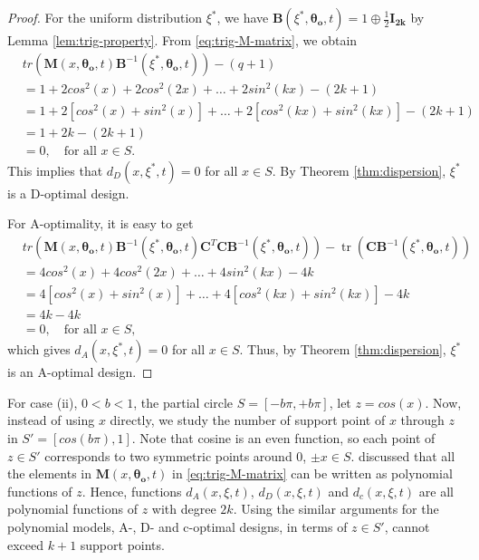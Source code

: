 \documentclass[
]{book}
\theoremstyle{definition}
\theoremstyle{definition}
\theoremstyle{definition}
\theoremstyle{definition}
\theoremstyle{remark}
\begin{document}
\begin{proof}
For the uniform distribution \(\xi^*\), we have \(\boldsymbol{B}(\xi^*,\boldsymbol{\theta_o},t)=1\oplus \frac{1}{2} \boldsymbol{I_{2k}}\) by Lemma \ref{lem:trig-property}. From \eqref{eq:trig-M-matrix}, we obtain
\begin{equation*}
\begin{aligned}
&tr(\boldsymbol{M}(x,\boldsymbol{\theta_o},t)\boldsymbol{B}^{-1}(\xi^*,\boldsymbol{\theta_o},t))-(q+1)\\    &=1+2cos^2(x)+2cos^2(2x)+\dots+2sin^2(kx)-(2k+1)\\
&=1+2[cos^2(x)+sin^2(x)]+\dots+2[cos^2(kx)+sin^2(kx)]-(2k+1)\\
        &=1+2k-(2k+1)\\
        &=0,\quad \text{for all } x\in S.
\end{aligned}
\end{equation*}
This implies that \(d_D(x,\xi^*,t)=0\) for all \(x\in S\). By Theorem \ref{thm:dispersion}, \(\xi^*\) is a D-optimal design.

For A-optimality, it is easy to get
\begin{equation*}
\begin{aligned}
&tr(\boldsymbol{M}(x,\boldsymbol{\theta_o},t)\boldsymbol{B}^{-1}(\xi^*,\boldsymbol{\theta_o},t)\boldsymbol{C}^T\boldsymbol{C}\boldsymbol{B}^{-1}(\xi^*,\boldsymbol{\theta_o},t))-\operatorname{tr}(\boldsymbol{C}\boldsymbol{B}^{-1}(\xi^*,\boldsymbol{\theta_o},t))\\&=4cos^2(x)+4cos^2(2x)+\dots+4sin^2(kx)-4k\\
&=4[cos^2(x)+sin^2(x)]+\dots+4[cos^2(kx)+sin^2(kx)]-4k\\
&=4k-4k\\
&=0,\quad \text{for all } x\in S,
\end{aligned}
\end{equation*}
which gives \(d_A(x,\xi^*,t)=0\) for all \(x \in S\). Thus, by Theorem \ref{thm:dispersion}, \(\xi^*\) is an A-optimal design.
\end{proof}

For case (ii), \(0<b<1\), the partial circle \(S=[-b\pi,+b\pi]\), let \(z=cos(x)\). Now, instead of using \(x\) directly, we study the number of support point of \(x\) through \(z\) in \(S'=[cos(b\pi),1]\). Note that cosine is an even function, so each point of \(z\in S'\) corresponds to two symmetric points around \(0\), \(\pm x\in S\). \citet{gao2017d} discussed that all the elements in \(\boldsymbol{M}(x,\boldsymbol{\theta_o},t)\) in \eqref{eq:trig-M-matrix} can be written as polynomial functions of \(z\). Hence, functions \(d_A(x,\xi,t)\), \(d_D(x,\xi,t)\) and \(d_c(x,\xi,t)\) are all polynomial functions of \(z\) with degree \(2k\). Using the similar arguments for the polynomial models, A-, D- and c-optimal designs, in terms of \(z\in S'\), cannot exceed \(k+1\) support points.
\end{document}

